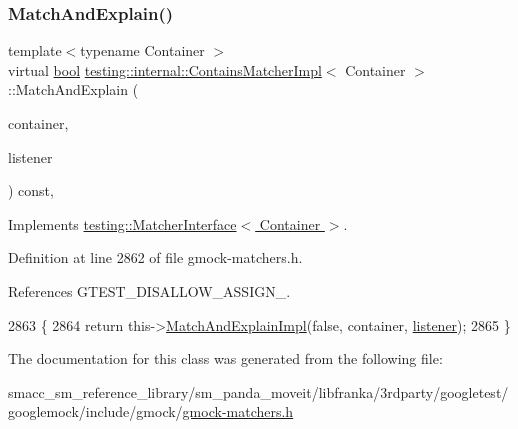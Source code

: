 \subsubsection{\texorpdfstring{Match\+And\+Explain()}{MatchAndExplain()}}
{\footnotesize\ttfamily template$<$typename Container $>$ \\
virtual \hyperlink{classbool}{bool} \hyperlink{classtesting_1_1internal_1_1ContainsMatcherImpl}{testing\+::internal\+::\+Contains\+Matcher\+Impl}$<$ Container $>$\+::Match\+And\+Explain (\begin{DoxyParamCaption}\item[{Container}]{container,  }\item[{\hyperlink{classtesting_1_1MatchResultListener}{Match\+Result\+Listener} $\ast$}]{listener }\end{DoxyParamCaption}) const\hspace{0.3cm}{\ttfamily [inline]}, {\ttfamily [virtual]}}



Implements \hyperlink{classtesting_1_1MatcherInterface_a296b43607cd99d60365f0e6a762777cf}{testing\+::\+Matcher\+Interface$<$ Container $>$}.



Definition at line 2862 of file gmock-\/matchers.\+h.



References G\+T\+E\+S\+T\+\_\+\+D\+I\+S\+A\+L\+L\+O\+W\+\_\+\+A\+S\+S\+I\+G\+N\+\_\+.


\begin{DoxyCode}
2863                                                                     \{
2864     \textcolor{keywordflow}{return} this->\hyperlink{classtesting_1_1internal_1_1QuantifierMatcherImpl_ab8f64532b70f47fc60f7983ebe5cbfc6}{MatchAndExplainImpl}(\textcolor{keyword}{false}, container, 
      \hyperlink{namespaceinteractive__marker_a0e579ab555212bb5e2c9f8a675b7618a}{listener});
2865   \}
\end{DoxyCode}


The documentation for this class was generated from the following file\+:\begin{DoxyCompactItemize}
\item 
smacc\+\_\+sm\+\_\+reference\+\_\+library/sm\+\_\+panda\+\_\+moveit/libfranka/3rdparty/googletest/googlemock/include/gmock/\hyperlink{gmock-matchers_8h}{gmock-\/matchers.\+h}\end{DoxyCompactItemize}
